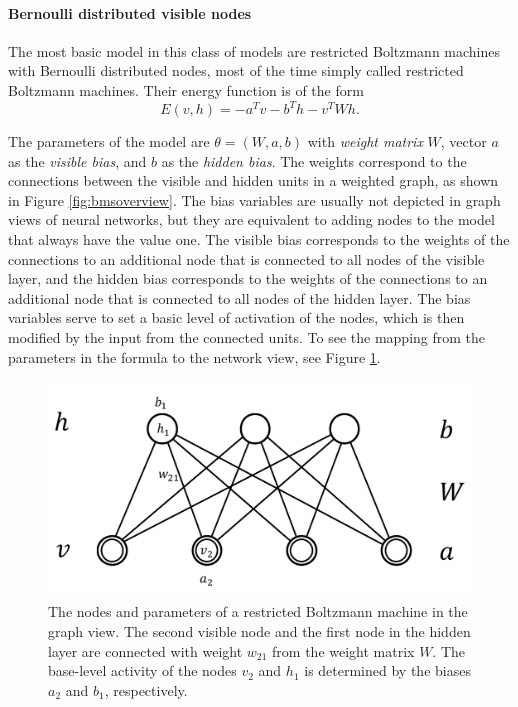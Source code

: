 \documentclass[12pt]{article}
\begin{document}
\paragraph{Bernoulli distributed visible nodes}
The most basic model in this class of models are restricted Boltzmann machines with Bernoulli distributed nodes, most of the time simply called restricted Boltzmann machines. Their energy function is of the form
\begin{equation}
   E(v,h) = - a^T v - b^T h - v^T W h. \label{eqn:energyformularbm}
\end{equation}

The parameters of the model are $\theta = (W, a, b)$ with \emph{weight matrix} $W$, vector $a$ as the \emph{visible bias}, and $b$ as the \emph{hidden bias}.
The weights correspond to the connections between the visible and hidden units in a weighted graph, as shown in Figure \ref{fig:bmsoverview}.
The bias variables are usually not depicted in graph views of neural networks, but they are equivalent to adding nodes to the model that always have the value one. The visible bias corresponds to the weights of the connections to an additional node that is connected to all nodes of the visible layer, and the hidden bias corresponds to the weights of the connections to an additional node that is connected to all nodes of the hidden layer. The bias variables serve to set a basic level of activation of the nodes, which is then modified by the input from the connected units.
To see the mapping from the parameters in the formula to the network view, see Figure \ref{fig:rbmweights}.

\begin{figure}[h]
   \centering
   \includegraphics[scale=0.5]{images/rbmweights.pdf}
   \caption{The nodes and parameters of a restricted Boltzmann machine in the graph view. The second visible node and the first node in the hidden layer are connected with weight $w_{21}$ from the weight matrix $W$. The base-level activity of the nodes $v_2$ and $h_1$ is determined by the biases $a_2$ and $b_1$, respectively.}
   \label{fig:rbmweights}
 \end{figure}
\end{document}
